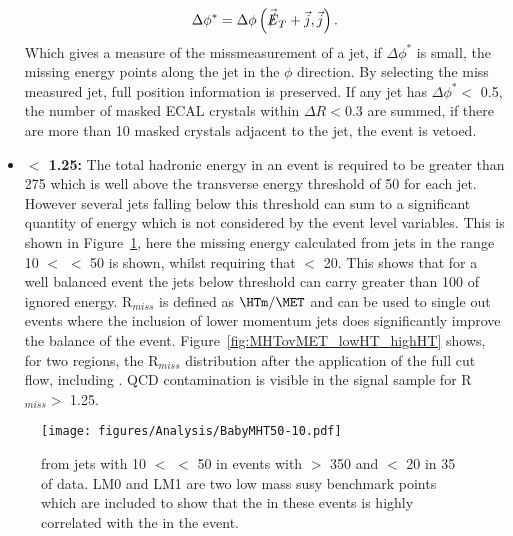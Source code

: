 \begin{itemize}
\begin{equation}
  \Delta\phi^{*} = \Delta\phi\left(\vec{\slashed{E}}_{T}+\vec{j},\vec{j} \right).
  \label{eq:biasedDphi}
\end{equation}
Which gives a measure of the missmeasurement of a jet, if $\Delta\phi^{*}$ is 
small, the missing energy points along the jet in the $\phi$ direction. By 
selecting the miss measured jet, full position information is preserved. If any 
jet has $\Delta\phi^{*} <$ 0.5, the number of masked ECAL crystals within 
$\Delta R < $0.3 are summed, if there are more than 10 masked crystals adjacent 
to the jet, the event is vetoed.
\item \textbf{\Rmiss$ <$ 1.25:} The total hadronic energy in an event is 
required to be greater than \unit{275}{\GeV} which is well above the transverse 
energy threshold of \unit{50}{\GeV} for each jet. However several jets falling 
below this threshold can sum to a significant quantity of energy which is not considered by the event level variables. This 
is shown in Figure~\ref{fig:figures_Analysis_BabyMHT50-10}, here the missing 
energy calculated from jets in the range \unit{10}{\GeV} $<$ \ET $<$ 
\unit{50}{\GeV} is shown, whilst requiring that \MET $<$ \unit{20}{\GeV}. This 
shows that for a well balanced event the jets below threshold can carry greater 
than \unit{100}{\GeV} of ignored energy. R$_{miss}$ is defined as $\HTm \slash 
\MET$ and can be used to single out events where the inclusion of lower 
momentum jets does significantly improve the balance of the event. 
Figure~\ref{fig:MHTovMET_lowHT_highHT} shows, for two \HT regions, the R$_{miss}$ distribution after the application of the full cut flow, including \alt. QCD contamination is visible in the signal sample for R$_{miss} >$ 1.25. 
\end{itemize}


\begin{figure}[htbp]
  \centering
    \texttt{[image: figures/Analysis/BabyMHT50-10.pdf]}
  \caption{\HTm from jets with \unit{10}{\GeV} $<$ \ET $<$ \unit{50}{\GeV} in events with \HT $>$ \unit{350}{\GeV} and \MET $<$ \unit{20}{\GeV} in \unit{35}{\invpicobarn} of data. LM0 and LM1 are two low mass \ac{susy} benchmark points which are included to show that the \HTm in these events is highly correlated with the \ETm in the event.}
  \label{fig:figures_Analysis_BabyMHT50-10}
\end{figure}


